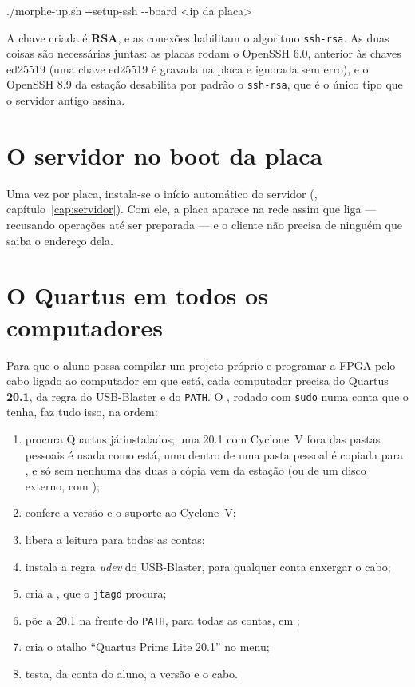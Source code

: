 \begin{center}
\ttfamily ./morphe-up.sh -{}-setup-ssh -{}-board <ip da placa>
\end{center}

A chave criada é \textbf{RSA}, e as conexões habilitam o algoritmo
\texttt{ssh-rsa}. As duas coisas são necessárias juntas: as placas rodam o
OpenSSH 6.0, anterior às chaves ed25519 (uma chave ed25519 é gravada na placa e
ignorada sem erro), e o OpenSSH 8.9 da estação desabilita por padrão o
\texttt{ssh-rsa}, que é o único tipo que o servidor antigo assina.

\section{O servidor no boot da placa}

Uma vez por placa, instala-se o início automático do servidor
(, capítulo~\ref{cap:servidor}). Com ele, a placa aparece na
rede assim que liga --- recusando operações até ser preparada --- e o cliente
não precisa de ninguém que saiba o endereço dela.

\section{O Quartus em todos os computadores}

Para que o aluno possa compilar um projeto próprio e programar a FPGA pelo cabo
ligado ao computador em que está, cada computador precisa do Quartus
\textbf{20.1}, da regra do USB-Blaster e do \texttt{PATH}. O
, rodado com \texttt{sudo} numa conta que o tenha, faz
tudo isso, na ordem:

\begin{enumerate}
  \item procura Quartus já instalados; uma 20.1 com Cyclone~V fora das pastas
    pessoais é usada como está, uma dentro de uma pasta pessoal é copiada para
    , e só sem nenhuma das duas a cópia vem da estação (ou de um
    disco externo, com );
  \item confere a versão e o suporte ao Cyclone~V;
  \item libera a leitura para todas as contas;
  \item instala a regra \emph{udev} do USB-Blaster, para qualquer conta
    enxergar o cabo;
  \item cria a , que o \texttt{jtagd} procura;
  \item põe a 20.1 na frente do \texttt{PATH}, para todas as contas, em
    ;
  \item cria o atalho ``Quartus Prime Lite 20.1'' no menu;
  \item testa, da conta do aluno, a versão e o cabo.
\end{enumerate}

